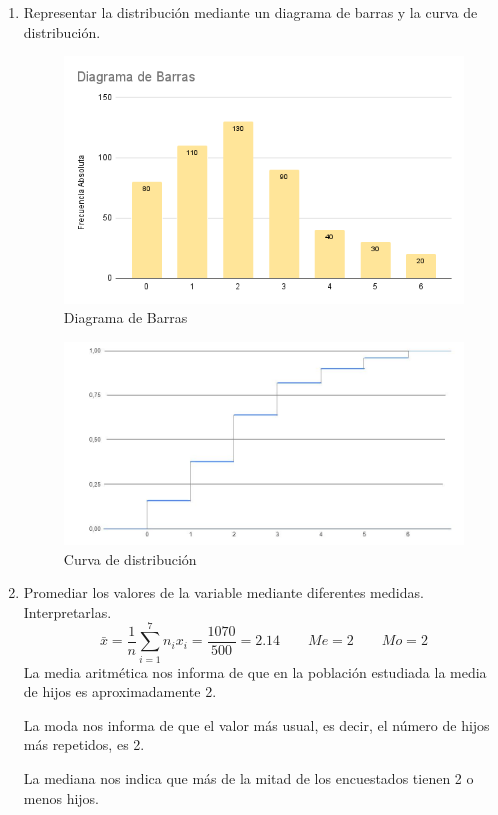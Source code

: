 \begin{ejercicio}
\begin{enumerate}
        \item Representar la distribución mediante un diagrama de barras y la curva de distribución.
        \begin{figure}[H]
            \centering
            \includegraphics[width=\linewidth]{Imagenes/Barras_Ej1.png}
            \caption{Diagrama de Barras}
        \end{figure}
        \begin{figure}[H]
            \centering
            \includegraphics[width=\linewidth]{Imagenes/CDF.jpg}
            \caption{Curva de distribución}
        \end{figure}

        \item Promediar los valores de la variable mediante diferentes medidas. Interpretarlas.
        $$\bar{x} = \frac{1}{n} \sum_{i=1}^7 n_ix_i = \frac{1070}{500} = 2.14 \qquad Me=2 \qquad Mo=2$$
        La media aritmética nos informa de que en la población estudiada la media de hijos es aproximadamente 2.

        La moda nos informa de que el valor más usual, es decir, el número de hijos más repetidos, es 2.

        La mediana nos indica que más de la mitad de los encuestados tienen 2 o menos hijos.
    \end{enumerate}
\end{ejercicio}


